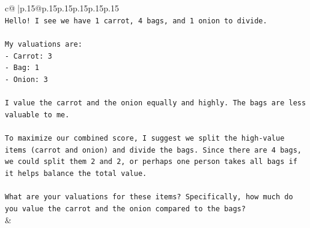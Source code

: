 \documentclass{article}
\begin{document}
{\begin{supertabular}{c@{$\;$}|p{.15\linewidth}@{}p{.15\linewidth}p{.15\linewidth}p{.15\linewidth}p{.15\linewidth}p{.15\linewidth}}
{{{\\ 
\texttt{Hello! I see we have 1 carrot, 4 bags, and 1 onion to divide.} \\
\\ 
\texttt{My valuations are:} \\
\texttt{{-} Carrot: 3} \\
\texttt{{-} Bag: 1} \\
\texttt{{-} Onion: 3} \\
\\ 
\texttt{I value the carrot and the onion equally and highly. The bags are less valuable to me.} \\
\\ 
\texttt{To maximize our combined score, I suggest we split the high{-}value items (carrot and onion) and divide the bags. Since there are 4 bags, we could split them 2 and 2, or perhaps one person takes all bags if it helps balance the total value.} \\
\\ 
\texttt{What are your valuations for these items? Specifically, how much do you value the carrot and the onion compared to the bags?} \\
            }
        }
    }
    & \\ \\


\end{supertabular}}
\end{document}
